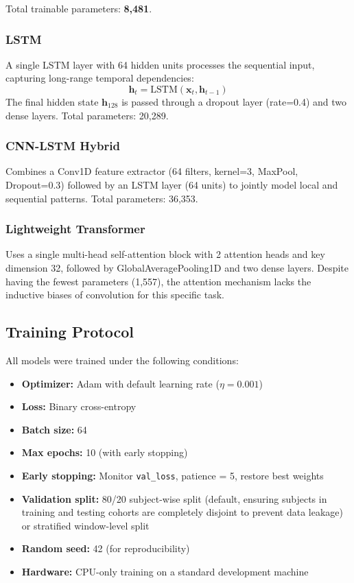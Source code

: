 \documentclass[journal]{IEEEtran}
\begin{document}
Total trainable parameters: \textbf{8,481}.

\subsubsection{LSTM}
A single LSTM layer with 64 hidden units processes the sequential input,
capturing long-range temporal dependencies:
\begin{equation}
  \mathbf{h}_t = \text{LSTM}(\mathbf{x}_t, \mathbf{h}_{t-1})
  \label{eq:lstm}
\end{equation}
The final hidden state $\mathbf{h}_{128}$ is passed through a dropout layer
(rate=0.4) and two dense layers. Total parameters: 20,289.

\subsubsection{CNN-LSTM Hybrid}
Combines a Conv1D feature extractor (64 filters, kernel=3, MaxPool, Dropout=0.3)
followed by an LSTM layer (64 units) to jointly model local and sequential patterns.
Total parameters: 36,353.

\subsubsection{Lightweight Transformer}
Uses a single multi-head self-attention block with 2 attention heads and key
dimension 32, followed by GlobalAveragePooling1D and two dense layers.
Despite having the fewest parameters (1,557), the attention mechanism lacks
the inductive biases of convolution for this specific task.

\subsection{Training Protocol}
\label{sec:training}

All models were trained under the following conditions:

\begin{itemize}
  \item \textbf{Optimizer:} Adam with default learning rate ($\eta = 0.001$)
  \item \textbf{Loss:} Binary cross-entropy
  \item \textbf{Batch size:} 64
  \item \textbf{Max epochs:} 10 (with early stopping)
  \item \textbf{Early stopping:} Monitor \texttt{val\_loss}, patience = 5,
        restore best weights
  \item \textbf{Validation split:} 80/20 subject-wise split (default, ensuring subjects in training and testing cohorts are completely disjoint to prevent data leakage) or stratified window-level split
  \item \textbf{Random seed:} 42 (for reproducibility)
  \item \textbf{Hardware:} CPU-only training on a standard development machine
\end{itemize}
\end{document}
